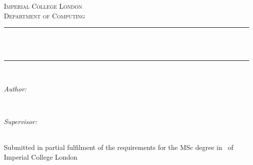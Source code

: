 \begin{titlepage}

\newcommand{\HRule}{\rule{\linewidth}{0.5mm}} %




\center


\textsc{\Large Imperial College London}\\[0.5cm] 
\textsc{\large Department of Computing}\\[0.5cm] 


\HRule \\[0.4cm]
{ \huge \bfseries \reporttitle}\\ %
\HRule \\[1.5cm]
 

\begin{minipage}{0.4\textwidth}
\begin{flushleft} \large
\emph{Author:}\\
\reportauthor %
\end{flushleft}
\end{minipage}
~
\begin{minipage}{0.4\textwidth}
\begin{flushright} \large
\emph{Supervisor:} \\
\supervisor %
\end{flushright}
\end{minipage}\\[4cm]


\vfill %
Submitted in partial fulfilment of the requirements for the MSc degree in
\degreetype~of Imperial College London\\[0.5cm]

\makeatletter
\@date 
\makeatother


\end{titlepage}
